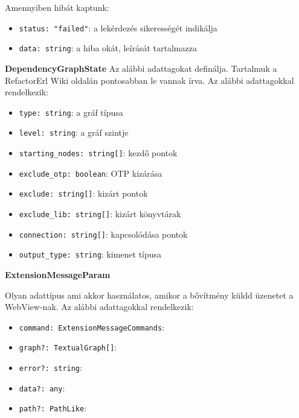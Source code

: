 \noindent Amennyiben hibát kaptunk:
\begin{itemize}
    \item \lstinline{status: "failed"}: a lekérdezés sikerességét indikálja
    \item \lstinline{data: string}: a hiba okát, leírását tartalmazza
\end{itemize}



\vspace{14pt}
\noindent \textbf{DependencyGraphState} 
\noindent Az alábbi adattagokat definálja. Tartalmuk a RefactorErl Wiki oldalán pontosabban le vannak írva. \cite{referlWikiDependency} Az alábbi adattagokkal rendelkezik:
\begin{itemize}
    \item \lstinline{type: string}: a gráf típusa
    \item \lstinline{level: string}: a gráf szintje
    \item \lstinline{starting_nodes: string[]}: kezdő pontok
    \item \lstinline{exclude_otp: boolean}: OTP kizárása
    \item \lstinline{exclude: string[]}: kizárt pontok
    \item \lstinline{exclude_lib: string[]}: kizárt könyvtárak
    \item \lstinline{connection: string[]}: kapcsolódása pontok
    \item \lstinline{output_type: string}: kimenet típusa
    
\end{itemize}





\vspace{14pt}
\noindent \textbf{ExtensionMessageParam}

\noindent Olyan adattípus ami akkor használatos, amikor a bővítmény küldd üzenetet a WebView-nak. Az alábbi adattagokkal rendelkezik:

\begin{itemize}
    \item \lstinline{command: ExtensionMessageCommands}:
    \item \lstinline{graph?: TextualGraph[]}:
    \item \lstinline{error?: string}:
    \item \lstinline{data?: any}:
    \item \lstinline{path?: PathLike}:
\end{itemize}





